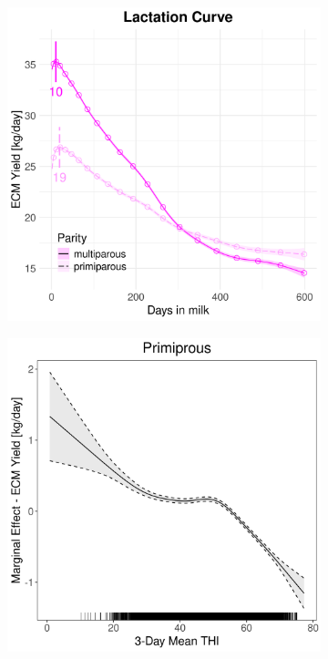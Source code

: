 \begin{figure}[H]
\begin{subfigure}[b]{0.45\textwidth}
        \includegraphics[width=\textwidth]{thesis/figures/models/ecm/after2010/sf_ecm_after2010/sf_ecm_after2010_marginal_dim_milk_combined.png}
    \end{subfigure}
    \begin{subfigure}[b]{0.45\textwidth}
        \centering
        \includegraphics[width=\textwidth]{thesis/figures/models/ecm/after2010/sf_ecm_after2010/sf_ecm_after2010_marginal_thi_milk_primi.png}

\end{subfigure}
\end{figure}
